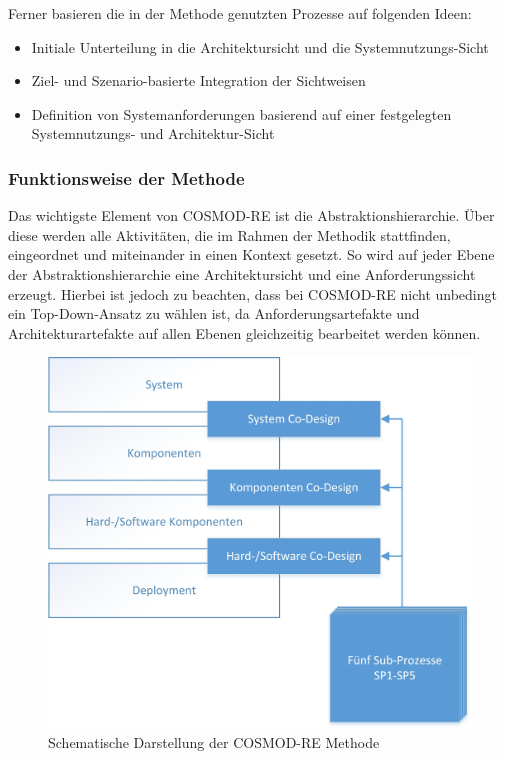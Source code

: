 Ferner basieren die in der Methode genutzten Prozesse auf folgenden Ideen: \cite{Poh01} \\

\begin{itemize}
\item Initiale Unterteilung in die Architektursicht und die Systemnutzungs-Sicht
\item Ziel- und Szenario-basierte Integration der Sichtweisen
\item Definition von Systemanforderungen basierend auf einer festgelegten Systemnutzungs- und Architektur-Sicht \\
\end{itemize}

\subsubsection{Funktionsweise der Methode}
Das wichtigste Element von COSMOD-RE ist die Abstraktionshierarchie. \"Uber diese werden alle Aktivit\"aten, die im Rahmen der Methodik stattfinden, eingeordnet und miteinander in einen Kontext gesetzt. So wird auf jeder Ebene der Abstraktionshierarchie eine Architektursicht und eine Anforderungssicht erzeugt. Hierbei ist jedoch zu beachten, dass bei COSMOD-RE nicht unbedingt ein Top-Down-Ansatz zu w\"ahlen ist, da Anforderungsartefakte und Architekturartefakte auf allen Ebenen gleichzeitig bearbeitet werden k\"onnen.\\

\begin{figure}[h]
	\centering
	\includegraphics[scale=0.75]{COSMODREoverview.jpg} 
	\caption{Schematische Darstellung der COSMOD-RE Methode}\label{cosmodreow}
\end{figure}

